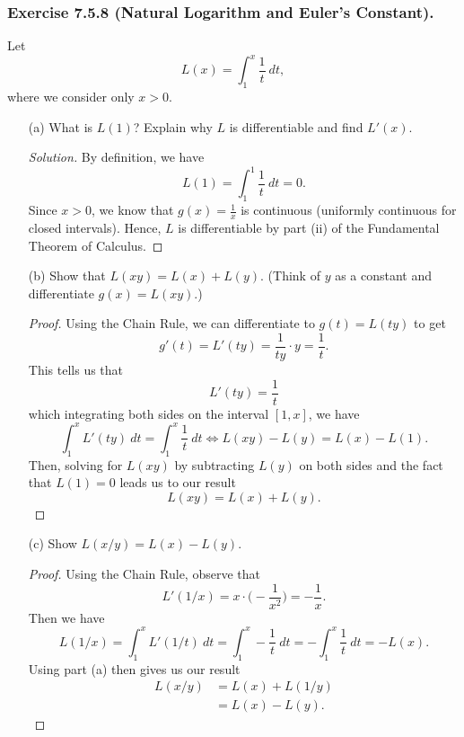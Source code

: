 \subsubsection{Exercise 7.5.8 (Natural Logarithm and Euler's Constant).} Let 
\[  L(x) = \int_{ 1 }^{ x } \frac{ 1 }{ t }  \  dt, \]
where we consider only \( x > 0  \).
\begin{enumerate}
    \item[(a)] What is \( L(1)  \)? Explain why \( L  \) is differentiable and find \( L'(x)  \).
		\begin{proof}[Solution]
		By definition, we have 
		\[  L(1) = \int_{ 1 }^{ 1 } \frac{ 1 }{ t } \   dt = 0. \] Since \( x > 0  \), we know that \( g(x) = \frac{ 1 }{ x  }  \) is continuous (uniformly continuous for closed intervals). Hence, \( L  \) is differentiable by part (ii) of the Fundamental Theorem of Calculus.
		\end{proof}
	\item[(b)] Show that \( L(xy) = L(x) + L(y)  \). (Think of \( y  \) as a constant and differentiate \( g(x) = L(xy)  \).) 
		\begin{proof}
		Using the Chain Rule, we can differentiate to \( g(t) = L(ty)  \) to get 
		\[  g'(t) = L'(ty) = \frac{ 1 }{ ty } \cdot y = \frac{ 1 }{ t }.  \]
		This tells us that 
		\[  L'(ty) = \frac{ 1 }{ t } \]
		which integrating both sides on the interval \( [1,x]  \), we have 
		\[  \int_{ 1 }^{ x } L'(ty)   \ dt = \int_{ 1 }^{ x } \frac{ 1 }{ t } \    dt \iff L(xy) - L(y) = L(x) - L(1)   .   \]
	Then, solving for \( L(xy)  \) by subtracting \( L(y)  \) on both sides and the fact that \( L(1) = 0  \) leads us to our result
	\[  L(xy) = L(x) + L(y). \]
		\end{proof}
	\item[(c)] Show \( L(x/y) = L(x) - L(y)  \).
		\begin{proof}
			Using the Chain Rule, observe that
		\[  L'(1/x) = x \cdot \Big( - \frac{ 1 }{ x^2 }  \Big) = -\frac{ 1 }{ x }.    \]
		Then we have 
		\[ L(1/x) = \int_{ 1 }^{ x } L'(1/t) \ dt = \int_{ 1 }^{ x } - \frac{ 1 }{ t } \    dt  = - \int_{ 1 }^{ x } \frac{ 1 }{ t } \    dt = - L(x). \]
		Using part (a) then gives us our result  
		\begin{align*}
		    L(x/y) &= L(x) + L(1/y) \\
				   &= L(x) - L(y).
		\end{align*}
		\end{proof}
\end{enumerate}



